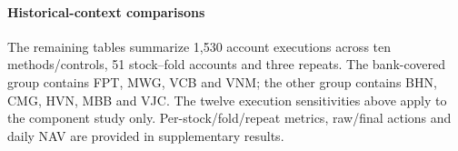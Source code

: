 \paragraph{Historical-context comparisons}
The remaining tables summarize 1,530 account executions across ten methods/controls, 51 stock--fold accounts and three repeats. The bank-covered group contains FPT, MWG, VCB and VNM; the other group contains BHN, CMG, HVN, MBB and VJC. The twelve execution sensitivities above apply to the component study only. Per-stock/fold/repeat metrics, raw/final actions and daily NAV are provided in supplementary results.









\FloatBarrier
